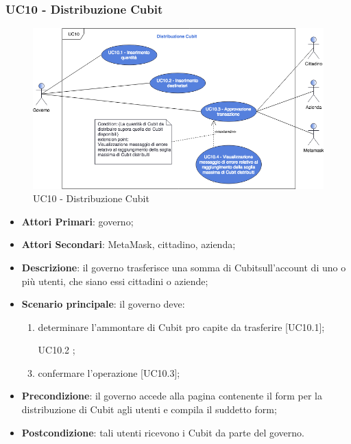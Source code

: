 \subsubsection{UC10 - Distribuzione Cubit}
\begin{figure}[h]
	\includegraphics[width=13.5cm]{res/images/UC10Distribuzione.png} %
	\centering
	\caption{UC10 - Distribuzione Cubit}
	
\end{figure}
\begin{itemize}
	\item \textbf{Attori Primari}: governo;
	\item \textbf{Attori Secondari}: MetaMask\glo, cittadino, azienda\glo;
	\item \textbf{Descrizione}: il governo trasferisce una somma di Cubit\glosp sull'account di uno o più  utenti, che siano essi cittadini o aziende;
	\item \textbf{Scenario principale}: il governo deve:
	 \begin{enumerate}[label=\alph*.]
		\item determinare l'ammontare di Cubit pro capite da trasferire [UC10.1];
		\item  [UC10.2];
		\item confermare l'operazione [UC10.3];
	\end{enumerate}

	\item \textbf{Precondizione}: il governo accede alla pagina contenente il form per la distribuzione di Cubit agli utenti e compila il suddetto form;
	\item \textbf{Postcondizione}: tali utenti ricevono i Cubit da parte del governo.
\end{itemize}
